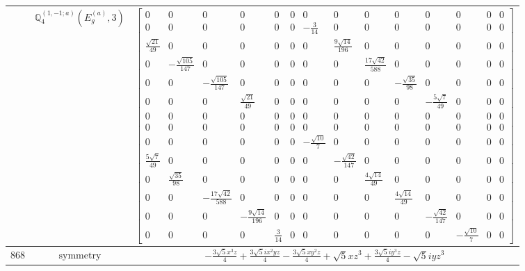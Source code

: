 \documentclass[fleqn,8pt,landscape]{jsarticle}
\begin{document}
\begin{longtable}{ccc}
$  $ & $ \mathbb{Q}_{4}^{(1,-1;a)}(E_{g}^{(a)},3) $ & $ \begin{bmatrix} 0 & 0 & 0 & 0 & 0 & 0 & 0 & 0 & 0 & 0 & 0 & 0 & 0 & 0 \\ 0 & 0 & 0 & 0 & 0 & 0 & - \frac{3}{14} & 0 & 0 & 0 & 0 & 0 & 0 & 0 \\ \frac{\sqrt{21}}{49} & 0 & 0 & 0 & 0 & 0 & 0 & \frac{9 \sqrt{14}}{196} & 0 & 0 & 0 & 0 & 0 & 0 \\ 0 & - \frac{\sqrt{105}}{147} & 0 & 0 & 0 & 0 & 0 & 0 & \frac{17 \sqrt{42}}{588} & 0 & 0 & 0 & 0 & 0 \\ 0 & 0 & - \frac{\sqrt{105}}{147} & 0 & 0 & 0 & 0 & 0 & 0 & - \frac{\sqrt{35}}{98} & 0 & 0 & 0 & 0 \\ 0 & 0 & 0 & \frac{\sqrt{21}}{49} & 0 & 0 & 0 & 0 & 0 & 0 & - \frac{5 \sqrt{7}}{49} & 0 & 0 & 0 \\ 0 & 0 & 0 & 0 & 0 & 0 & 0 & 0 & 0 & 0 & 0 & 0 & 0 & 0 \\ 0 & 0 & 0 & 0 & 0 & 0 & 0 & 0 & 0 & 0 & 0 & 0 & 0 & 0 \\ 0 & 0 & 0 & 0 & 0 & 0 & - \frac{\sqrt{10}}{7} & 0 & 0 & 0 & 0 & 0 & 0 & 0 \\ \frac{5 \sqrt{7}}{49} & 0 & 0 & 0 & 0 & 0 & 0 & - \frac{\sqrt{42}}{147} & 0 & 0 & 0 & 0 & 0 & 0 \\ 0 & \frac{\sqrt{35}}{98} & 0 & 0 & 0 & 0 & 0 & 0 & \frac{4 \sqrt{14}}{49} & 0 & 0 & 0 & 0 & 0 \\ 0 & 0 & - \frac{17 \sqrt{42}}{588} & 0 & 0 & 0 & 0 & 0 & 0 & \frac{4 \sqrt{14}}{49} & 0 & 0 & 0 & 0 \\ 0 & 0 & 0 & - \frac{9 \sqrt{14}}{196} & 0 & 0 & 0 & 0 & 0 & 0 & - \frac{\sqrt{42}}{147} & 0 & 0 & 0 \\ 0 & 0 & 0 & 0 & \frac{3}{14} & 0 & 0 & 0 & 0 & 0 & 0 & - \frac{\sqrt{10}}{7} & 0 & 0 \end{bmatrix} $ \\ \hline
$ 868 $ & $ \text{symmetry} $ & $ - \frac{3 \sqrt{5} x^{3} z}{4} + \frac{3 \sqrt{5} i x^{2} y z}{4} - \frac{3 \sqrt{5} x y^{2} z}{4} + \sqrt{5} x z^{3} + \frac{3 \sqrt{5} i y^{3} z}{4} - \sqrt{5} i y z^{3} $ \\

\end{longtable}
\end{document}
